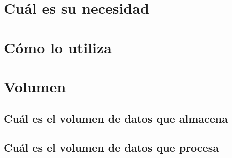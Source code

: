 %
%

\section{Cuál es su necesidad}

\lipsum[2] %


\clearpage
\section{Cómo lo utiliza}

\lipsum[2] %

\clearpage
\section{Volumen}

\lipsum[1] %

\subsection{Cuál es el volumen de datos que almacena}
\lipsum[1] %

\subsection{Cuál es el volumen de datos que procesa}
\lipsum[1] %

